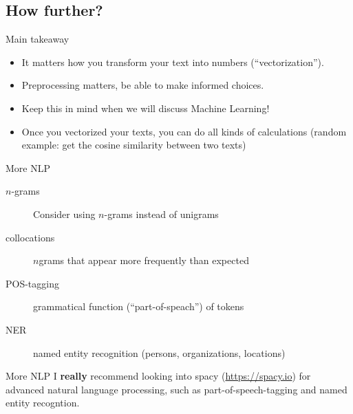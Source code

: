\subsection{How further?}


\begin{frame}{Main takeaway}

\begin{itemize}
	\item It matters how you transform your text into numbers (``vectorization'').
	\item Preprocessing matters, be able to make informed choices.
	\item Keep this in mind when we will discuss Machine Learning!
\end{itemize}

\begin{itemize}
	\item Once you vectorized your texts, you can do all kinds of calculations (random example: get the cosine similarity between two texts)
\end{itemize}

\end{frame}


\begin{frame}{More NLP}
\begin{description}
	\item[$n$-grams] Consider using $n$-grams instead of unigrams
	\item[collocations]  $n$grams that appear more frequently than expected
	\item[POS-tagging] grammatical function (``part-of-speach'') of tokens
	\item[NER] named entity recognition (persons, organizations, locations)
\end{description}
\end{frame}

\begin{frame}{More NLP}
I \textbf{really} recommend looking into spacy (\url{https://spacy.io}) for advanced natural language processing, such as part-of-speech-tagging and named entity recogntion.
\end{frame}


